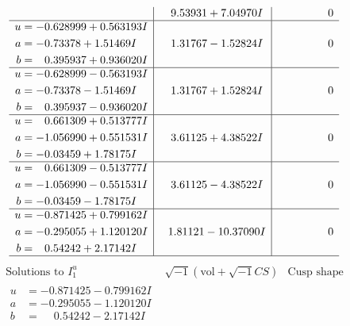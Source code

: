 \documentclass[1p]{elsarticle_modified}
\theoremstyle{definition}
\newcommand{\I}{\sqrt{-1}}
\begin{document}
$$\begin{array}{c|c|c}
 & \phantom{-}9.53931 + 7.04970 I & \phantom{-0.000000 } 0 \\ \hline\begin{aligned}
u &= -0.628999 + 0.563193 I \\
a &= -0.73378 + 1.51469 I \\
b &= \phantom{-}0.395937 + 0.936020 I\end{aligned}
 & \phantom{-}1.31767 - 1.52824 I & \phantom{-0.000000 } 0 \\ \hline\begin{aligned}
u &= -0.628999 - 0.563193 I \\
a &= -0.73378 - 1.51469 I \\
b &= \phantom{-}0.395937 - 0.936020 I\end{aligned}
 & \phantom{-}1.31767 + 1.52824 I & \phantom{-0.000000 } 0 \\ \hline\begin{aligned}
u &= \phantom{-}0.661309 + 0.513777 I \\
a &= -1.056990 + 0.551531 I \\
b &= -0.03459 + 1.78175 I\end{aligned}
 & \phantom{-}3.61125 + 4.38522 I & \phantom{-0.000000 } 0 \\ \hline\begin{aligned}
u &= \phantom{-}0.661309 - 0.513777 I \\
a &= -1.056990 - 0.551531 I \\
b &= -0.03459 - 1.78175 I\end{aligned}
 & \phantom{-}3.61125 - 4.38522 I & \phantom{-0.000000 } 0 \\ \hline\begin{aligned}
u &= -0.871425 + 0.799162 I \\
a &= -0.295055 + 1.120120 I \\
b &= \phantom{-}0.54242 + 2.17142 I\end{aligned}
 & \phantom{-}1.81121 - 10.37090 I & \phantom{-0.000000 } 0\\
 \hline 
 \end{array}$$\newpage$$\begin{array}{c|c|c}  
\text{Solutions to }I^u_{1}& \I (\text{vol} + \sqrt{-1}CS) & \text{Cusp shape}\\
 \hline 
\begin{aligned}
u &= -0.871425 - 0.799162 I \\
a &= -0.295055 - 1.120120 I \\
b &= \phantom{-}0.54242 - 2.17142 I\end{aligned}

\end{array}$$
\end{document}
